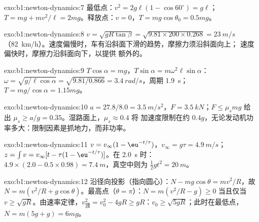 \begin{solution}{exo:b1:newton-dynamics:7}
最低点：$v^2 = 2g\ell(1 - \cos 60^\circ) = g\ell$；$T = mg + mv^2/\ell =
2mg$。释放点：$v = 0$，$T = mg\cos\theta_0 = 0.5mg$。
\end{solution}

\begin{solution}{exo:b1:newton-dynamics:8}
$v = \sqrt{gR\tan\beta} = \sqrt{9.81 \times 200 \times 0.268} = \qty{23}{m/s}$
（\qty{82}{km/h}）。速度偏慢时，车有沿斜面下滑的趋势，摩擦力须沿斜面向上；
速度偏快时，摩擦力沿斜面向下，以提供
额外的。
\end{solution}

\begin{solution}{exo:b1:newton-dynamics:9}
$T\cos\alpha = mg$，$T\sin\alpha = m\omega^2\ell\sin\alpha$：$\omega =
\sqrt{g/\ell\cos\alpha} = \sqrt{9.81/0.866} = \qty{3.4}{rad/s}$，周期
\qty{1.9}{s}；$T = mg/\cos\alpha = 1.15mg$。
\end{solution}

\begin{solution}{exo:b1:newton-dynamics:10}
$a = 27.8/8.0 = \qty{3.5}{m/s^2}$，$F = \qty{3.5}{kN}$；$F \leq \mu_smg$
给出 $\mu_s \geq a/g = 0.35$。湿路面上，$\mu_s \approx 0.4$ 将
加速度限制在约 $0.4g$，无论发动机功率多大：限制因素是抓地力，而非功率。
\end{solution}

\begin{solution}{exo:b1:newton-dynamics:11}
$v = v_\infty(1 - \eu^{-t/\tau})$，$v_\infty = g\tau = \qty{4.9}{m/s}$；
$z = \int v = v_\infty[t - \tau(1 - \eu^{-t/\tau})]$。在 \qty{2.0}{s} 时：
$4.9 \times (2.0 - 0.5 \times 0.98) = \qty{7.4}{m}$，真空中则为 $\tfrac12 gt^2
= \qty{20}{m}$。
\end{solution}

\begin{solution}{exo:b1:newton-dynamics:12}
沿径向投影（指向圆心）：$N - mg\cos\theta = mv^2/R$，故
$N = m(v^2/R + g\cos\theta)$。最高点（$\theta = \pi$）：$N = m(v^2/R - g)
\geq 0$ 当且仅当 $v \geq \sqrt{gR}$。由速率定律，$v_{\text{顶}}^2 =
v_0^2 - 4gR \geq gR$：$v_0 \geq \sqrt{5gR}$；此时在最低点，$N =
m(5g + g) = 6mg$。
\end{solution}

